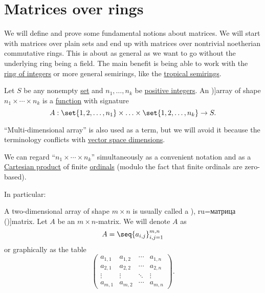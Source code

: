 \section{Matrices over rings}\label{sec:matrices_over_rings}

We will define and prove some fundamental notions about matrices. We will start with matrices over plain sets and end up with matrices over nontrivial noetherian commutative rings. This is about as general as we want to go without the underlying ring being a field. The main benefit is being able to work with the \hyperref[def:integers]{ring of integers} or more general semirings, like the \hyperref[def:tropical_semiring]{tropical semirings}.

\begin{definition}\label{def:array}\mimprovised
  Let \( S \) be any nonempty \hyperref[def:set]{set} and \( n_1, \ldots, n_k \) be \hyperref[def:integer_signum]{positive integers}. An \term[ru=массив (\cite[sec. 40.1]{Тыртышников2007ЛинейнаяАлгебра})]{array} of shape \( n_1 \times \cdots \times n_k \) is a \hyperref[def:function]{function} with signature
  \begin{equation*}
    A: \set{ 1, 2, \ldots, n_1 } \times \ldots \times \set{ 1, 2, \ldots, n_k } \to S.
  \end{equation*}

  \enquote{Multi-dimensional array} is also used as a term, but we will avoid it because the terminology conflicts with \hyperref[thm:vector_space_dimension]{vector space dimensions}.

  We can regard \enquote{\( n_1 \times \cdots \times n_k \)} simultaneously as a convenient notation and as a \hyperref[def:cartesian_product]{Cartesian product} of finite \hyperref[def:ordinal]{ordinals} (modulo the fact that finite ordinals are zero-based).

  In particular:
  \begin{thmenum}
     A two-dimensional array of shape \( m \times n \) is usually called a \term[ru=матрица (\cite[\S 1.1.2]{ПетровЗяпков2000ЛААГТом1}), ru=матрица (\cite[sec. 1.1]{Тыртышников2007ЛинейнаяАлгебра})]{matrix}. Let \( A \) be an \( m \times n \)-matrix. We will denote \( A \) as
    \begin{equation*}
      A = \seq{ a_{i,j} }_{i,j=1}^{m,n}
    \end{equation*}
    or graphically as the table
    \begin{equation*}
      \begin{pmatrix}
        a_{1,1} & a_{1,2} & \cdots & a_{1,n} \\
        a_{2,1} & a_{2,2} & \cdots & a_{2,n} \\
        \vdots  & \vdots  & \ddots & \vdots  \\
        a_{m,1} & a_{m,2} & \cdots & a_{m,n}
      \end{pmatrix}.
    \end{equation*}


\end{thmenum}
\end{definition}
